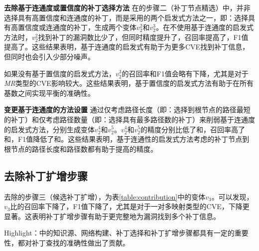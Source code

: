\textbf{去除基于连通度或置信度的补丁选择方法}
在\tool 的步骤二（补丁节点精选）中，并非选择具有高置信度和连通度的补丁，而是采用的两个启发式方法之一，即：选择具有高置信度或连通度的补丁，生成两个变体$v_2^2$和$v_2^3$。在不使用基于连通度的启发式方法时，$v_2^2$找到补丁的漏洞数比\tool 少了，但同时精度提升了，召回率提高了，F1值提高了。这些结果表明，基于连通度的启发式有助于为更多CVE找到补丁信息，但同时也会引入少部分噪声。

如果没有基于置信度的启发式方法，$v_2^3$的召回率和F1值会略有下降，尤其是对于\textit{MR}类型的CVE影响较大。这些结果表明，基于置信度的启发式方法有助于在所有基数之间实现平衡的准确性。

\textbf{变更基于连通度的方法设置}
通过仅考虑路径长度（即：选择到根节点的路径最短的补丁）和仅考虑路径数量（即：选择具有最多路径数的补丁）来削弱基于连通度的启发式方法，分别生成变体$v_2^4$和$v_2^5$。$v_2^4$和$v_2^5$的精度分别比\tool 低了和，召回率高了和，F1值降低了和。这些结果表明，基于连通性的启发式方法考虑的补丁节点到根节点的路径长度和路径数都有助于提高\tool 的精度。

\subsection{去除补丁扩增步骤}
去除\tool 的步骤三（候选补丁扩增），为表\ref{table:contribution}中的变体$v_3$。可以发现，$v_3$比\tool 的召回率下降了，F1值下降了，尤其是对于一对多映射类型的CVE，下降更显著。这表明补丁扩增步骤有助于更完整地为漏洞找到多个补丁信息。

\begin{tcolorbox}[size=title,opacityfill=0.15]
Highlight：\tool 中的知识源、网络构建、补丁选择和补丁扩增步骤都具有一定的重要性，都对\tool  补丁查找的准确性做出了贡献。
\end{tcolorbox}

